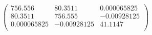 \documentclass{article}
\begin{document}
\[\left(
\begin{array}{ccc}
 756.556 & 80.3511 & 0.000065825 \\
 80.3511 & 756.555 & -0.00928125 \\
 0.000065825 & -0.00928125 & 41.1147 \\
\end{array}
\right)\]
\end{document}
